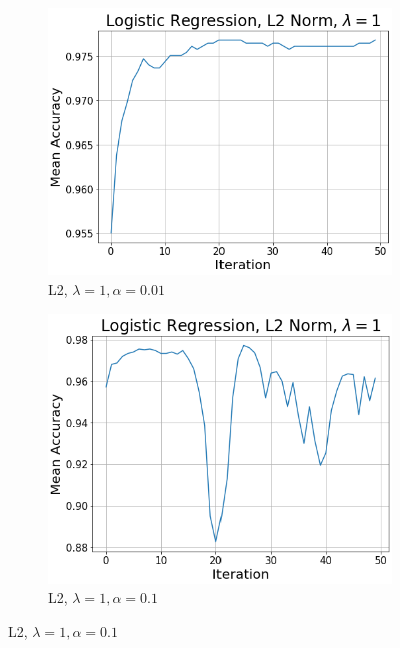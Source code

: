 \documentclass{article}
\begin{document}
\begin{enumerate}
\begin{figure}[h!]
     	\hfill
     	\begin{subfigure}[b]{0.3\textwidth}
         	\centering
         	\includegraphics[width=\textwidth]
         	{Problem_2_3/logistic_L2_2.png}
         	\caption{L2, $\lambda=1,\alpha=0.01$}
         	\label{fig:LR_L2_2}
     	\end{subfigure}
     	\hfill
     	\begin{subfigure}[b]{0.3\textwidth}
         	\centering
         	\includegraphics[width=\textwidth]
         	{Problem_2_3/logistic_L2_3.png}
         	\caption{L2, $\lambda=1,\alpha=0.1$}
         	\label{fig:LR_L2_3}
     	\end{subfigure}

\end{figure}
\end{enumerate}
\end{document}
